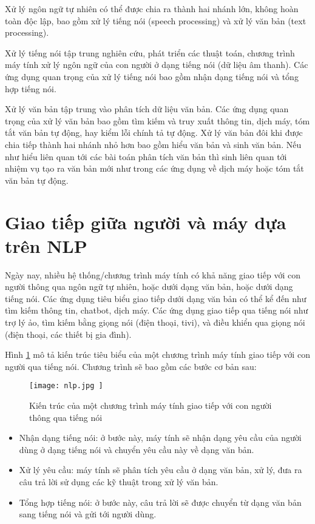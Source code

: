 Xử lý ngôn ngữ tự nhiên có thể được chia ra thành hai nhánh lớn, không hoàn toàn độc lập, bao gồm xử lý tiếng nói (speech processing) và xử lý văn bản (text processing).

Xử lý tiếng nói tập trung nghiên cứu, phát triển các thuật toán, chương trình máy tính xử lý ngôn ngữ của con người ở dạng tiếng nói (dữ liệu âm thanh). Các ứng dụng quan trọng của xử lý tiếng nói bao gồm nhận dạng tiếng nói và tổng hợp tiếng nói.

Xử lý văn bản tập trung vào phân tích dữ liệu văn bản. Các ứng dụng quan trọng của xử lý văn bản bao gồm tìm kiếm và truy xuất thông tin, dịch máy, tóm tắt văn bản tự động, hay kiểm lỗi chính tả tự động. Xử lý văn bản đôi khi được chia tiếp thành hai nhánh nhỏ hơn bao gồm hiểu văn bản và sinh văn bản. Nếu như hiểu liên quan tới các bài toán phân tích văn bản thì sinh liên quan tới nhiệm vụ tạo ra văn bản mới như trong các ứng dụng về dịch máy hoặc tóm tắt văn bản tự động.

\section{Giao tiếp giữa người và máy dựa trên NLP}
Ngày nay, nhiều hệ thống/chương trình máy tính có khả năng giao tiếp với con người thông qua ngôn ngữ tự nhiên, hoặc dưới dạng văn bản, hoặc dưới dạng tiếng nói. Các ứng dụng tiêu biểu giao tiếp dưới dạng văn bản có thể kể đến như tìm kiếm thông tin, chatbot, dịch máy. Các ứng dụng giao tiếp qua tiếng nói như trợ lý ảo, tìm kiếm bằng giọng nói (điện thoại, tivi), và điều khiển qua giọng nói (điện thoại, các thiết bị gia đình)\cite{WEBSITE:1}.

Hình \ref{pic1.1} mô tả kiến trúc tiêu biểu của một chương trình máy tính giao tiếp với con người qua tiếng nói. Chương trình sẽ bao gồm các bước cơ bản sau:
\begin{figure}[h!]
	\centering
	\texttt{[image: 
		nlp.jpg
	]}
	\caption[Kiến trúc của một chương trình máy tính giao tiếp với con người thông qua tiếng nói ]{
		Kiến trúc của một chương trình máy tính giao tiếp với con người thông qua tiếng nói \label{pic1.1}
	}
\end{figure}


\begin{itemize}
	\item  Nhận dạng tiếng nói: ở bước này, máy tính sẽ nhận dạng yêu cầu của người dùng ở dạng tiếng nói và chuyển yêu cầu này về dạng văn bản.
	\item Xử lý yêu cầu: máy tính sẽ phân tích yêu cầu ở dạng văn bản, xử lý, đưa ra câu trả lời sử dụng các kỹ thuật trong xử lý văn bản.
	\item Tổng hợp tiếng nói: ở bước này, câu trả lời sẽ được chuyển từ dạng văn bản sang tiếng nói và gửi tới người dùng.
\end{itemize}


